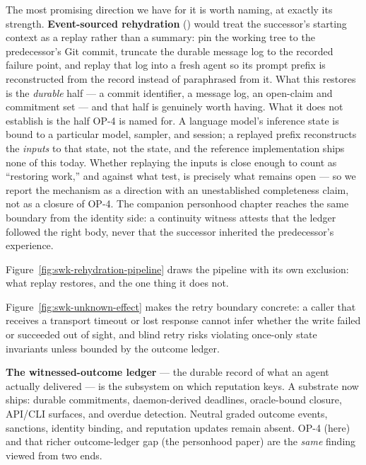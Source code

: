 \documentclass[11pt,a4paper]{article}
\theoremstyle{definition}
\theoremstyle{remark}
\begin{document}
The most promising direction we have for it is worth naming, at exactly its
strength. \textbf{Event-sourced rehydration} (\Designed) would treat the successor's
starting context as a replay rather than a summary: pin the working tree to the
predecessor's Git commit, truncate the durable message log to the recorded failure
point, and replay that log into a fresh agent so its prompt prefix is reconstructed
from the record instead of paraphrased from it. What this restores is the
\emph{durable} half --- a commit identifier, a message log, an open-claim and
commitment set --- and that half is genuinely worth having. What it does not
establish is the half OP-4 is named for. A language model's inference state is bound
to a particular model, sampler, and session; a replayed prefix reconstructs the
\emph{inputs} to that state, not the state, and the reference implementation ships
none of this today. Whether replaying the inputs is close enough to count as
``restoring work,'' and against what test, is precisely what remains open --- so we
report the mechanism as a direction with an unestablished completeness claim, not as
a closure of OP-4. The companion personhood chapter reaches the same boundary from
the identity side: a continuity witness attests that the ledger followed the right
body, never that the successor inherited the predecessor's experience.



Figure~\ref{fig:swk-rehydration-pipeline} draws the pipeline with its own
exclusion: what replay restores, and the one thing it does not.

Figure~\ref{fig:swk-unknown-effect} makes the retry boundary concrete: a
caller that receives a transport timeout or lost response cannot infer
whether the write failed or succeeded out of sight, and blind retry risks
violating once-only state invariants unless bounded by the outcome ledger.



\textbf{The witnessed-outcome ledger} --- the durable record of what an agent
actually delivered --- is the subsystem on which reputation keys. A \BuiltWeak{}
substrate now ships: durable commitments, daemon-derived deadlines, oracle-bound
closure, API/CLI surfaces, and overdue detection. Neutral graded outcome events,
sanctions, identity binding, and reputation updates remain absent. OP-4 (here) and
that richer outcome-ledger gap (the personhood paper) are the \emph{same} finding
viewed from two ends.
\end{document}
